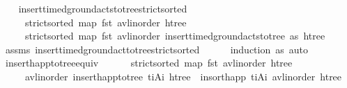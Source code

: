 \begin{isabellebody}
\isanewline
%
\endisadelimproof
\isanewline
\ \ \isamarkupfalse%
\ insert{\isacharunderscore}{\kern0pt}timed{\isacharunderscore}{\kern0pt}ground{\isacharunderscore}{\kern0pt}acts{\isacharunderscore}{\kern0pt}to{\isacharunderscore}{\kern0pt}tree{\isacharunderscore}{\kern0pt}strict{\isacharunderscore}{\kern0pt}sorted{\isacharcolon}{\kern0pt}\ \isanewline
\ \ \ \ \ {\isachardoublequoteopen}strict{\isacharunderscore}{\kern0pt}sorted\ {\isacharparenleft}{\kern0pt}map\ fst\ {\isacharparenleft}{\kern0pt}avl{\isacharunderscore}{\kern0pt}inorder\ htree{\isacharparenright}{\kern0pt}{\isacharparenright}{\kern0pt}{\isachardoublequoteclose}\isanewline
\ \ \ \ \ {\isachardoublequoteopen}strict{\isacharunderscore}{\kern0pt}sorted\ {\isacharparenleft}{\kern0pt}map\ fst\ {\isacharparenleft}{\kern0pt}avl{\isacharunderscore}{\kern0pt}inorder\ {\isacharparenleft}{\kern0pt}insert{\isacharunderscore}{\kern0pt}timed{\isacharunderscore}{\kern0pt}ground{\isacharunderscore}{\kern0pt}acts{\isacharunderscore}{\kern0pt}to{\isacharunderscore}{\kern0pt}tree\ as\ htree{\isacharparenright}{\kern0pt}{\isacharparenright}{\kern0pt}{\isacharparenright}{\kern0pt}{\isachardoublequoteclose}\isanewline
%
\isadelimproof
\ \ \ \ %
\endisadelimproof
%
\isatagproof
{}\isamarkupfalse%
\ assms\ insert{\isacharunderscore}{\kern0pt}timed{\isacharunderscore}{\kern0pt}ground{\isacharunderscore}{\kern0pt}act{\isacharunderscore}{\kern0pt}to{\isacharunderscore}{\kern0pt}tree{\isacharunderscore}{\kern0pt}strict{\isacharunderscore}{\kern0pt}sorted\isanewline
\ \ \ \ \isamarkupfalse%
\ {\isacharparenleft}{\kern0pt}induction\ as{\isacharparenright}{\kern0pt}\ auto%
\endisatagproof
{\isafoldproof}%
%
\isadelimproof
\isanewline
%
\endisadelimproof
\isanewline
\ \ \isanewline
\ \ \isamarkupfalse%
\ insert{\isacharunderscore}{\kern0pt}happ{\isacharunderscore}{\kern0pt}to{\isacharunderscore}{\kern0pt}tree{\isacharunderscore}{\kern0pt}equiv{\isacharcolon}{\kern0pt}\ \isanewline
\ \ \ \ \ {\isachardoublequoteopen}strict{\isacharunderscore}{\kern0pt}sorted\ {\isacharparenleft}{\kern0pt}map\ fst\ {\isacharparenleft}{\kern0pt}avl{\isacharunderscore}{\kern0pt}inorder\ htree{\isacharparenright}{\kern0pt}{\isacharparenright}{\kern0pt}{\isachardoublequoteclose}\isanewline
\ \ \ \ \ {\isachardoublequoteopen}avl{\isacharunderscore}{\kern0pt}inorder\ {\isacharparenleft}{\kern0pt}insert{\isacharunderscore}{\kern0pt}happ{\isacharunderscore}{\kern0pt}to{\isacharunderscore}{\kern0pt}tree\ {\isacharparenleft}{\kern0pt}t\isactrlsub i{\isacharcomma}{\kern0pt}A\isactrlsub i{\isacharparenright}{\kern0pt}\ htree{\isacharparenright}{\kern0pt}\ {\isacharequal}{\kern0pt}\ insort{\isacharunderscore}{\kern0pt}happ\ {\isacharparenleft}{\kern0pt}t\isactrlsub i{\isacharcomma}{\kern0pt}A\isactrlsub i{\isacharparenright}{\kern0pt}\ {\isacharparenleft}{\kern0pt}avl{\isacharunderscore}{\kern0pt}inorder\ htree{\isacharparenright}{\kern0pt}{\isachardoublequoteclose}\isanewline

\end{isabellebody}
